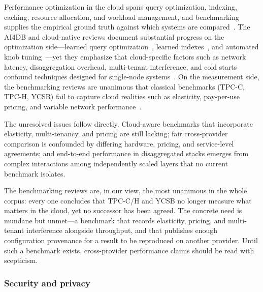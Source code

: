 \documentclass[a4paper,fleqn]{cas-sc}
\begin{document}
Performance optimization in the cloud spans query optimization, indexing, caching, resource allocation, and workload management, and benchmarking supplies the empirical ground truth against which systems are compared~\cite{Rabl2019BenchmarkSurvey}. The AI4DB and cloud-native reviews document substantial progress on the optimization side---learned query optimization~\cite{Marcus2021Bao}, learned indexes~\cite{Kraska2018LearnedIndex}, and automated knob tuning~\cite{Zhang2022CDBTune}---yet they emphasize that cloud-specific factors such as network latency, disaggregation overhead, multi-tenant interference, and cold starts confound techniques designed for single-node systems~\cite{Zhou2022AI4DB,Li2024CloudNativeSurvey}. On the measurement side, the benchmarking reviews are unanimous that classical benchmarks (TPC-C, TPC-H, YCSB) fail to capture cloud realities such as elasticity, pay-per-use pricing, and variable network performance~\cite{Rabl2019BenchmarkSurvey,Taipalus2024DBMSPerf,Samarta2024SQLNoSQL,Daundasekara2025MultiCloud}.

The unresolved issues follow directly. Cloud-aware benchmarks that incorporate elasticity, multi-tenancy, and pricing are still lacking; fair cross-provider comparison is confounded by differing hardware, pricing, and service-level agreements; and end-to-end performance in disaggregated stacks emerges from complex interactions among independently scaled layers that no current benchmark isolates.

The benchmarking reviews are, in our view, the most unanimous in the whole corpus: every one concludes that TPC-C/H and YCSB no longer measure what matters in the cloud, yet no successor has been agreed. The concrete need is mundane but unmet---a benchmark that records elasticity, pricing, and multi-tenant interference alongside throughput, and that publishes enough configuration provenance for a result to be reproduced on another provider. Until such a benchmark exists, cross-provider performance claims should be read with scepticism.

\subsubsection{Security and privacy}
\label{subsubsec:security}
\end{document}
